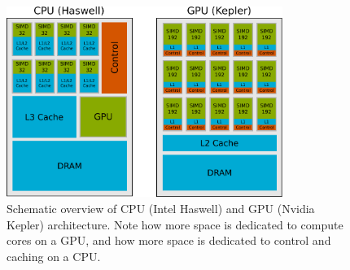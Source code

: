 \begin{figure}
\centering
\includegraphics[width=0.8\textwidth]{img/CPU-GPU.pdf}
\caption{Schematic overview of CPU (Intel Haswell) and GPU (Nvidia Kepler) architecture. Note how more space is dedicated to compute cores on a GPU, and how more space is dedicated to control and caching on a CPU.}
\label{fig:cpu_gpu}
\end{figure}

